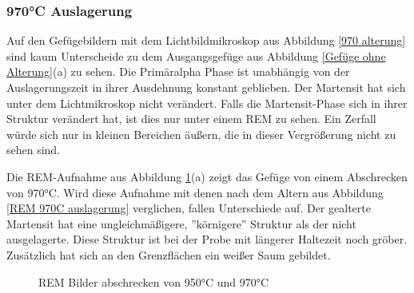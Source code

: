 \documentclass[a4paper, 11pt]{tubsreprt}
\begin{document}
\subsubsection{970°C Auslagerung}
Auf den Gefügebildern mit dem Lichtbildmikroskop aus Abbildung \ref{970 alterung} sind kaum Unterscheide zu dem Ausgangsgefüge aus Abbildung \ref{Gefüge ohne Alterung}(a) zu sehen. Die Primäralpha Phase ist unabhängig von der Auslagerungszeit in ihrer Ausdehnung konstant geblieben. Der Martensit hat sich unter dem Lichtmikroskop nicht verändert. Falls die Martensit-Phase sich in ihrer Struktur verändert hat, ist dies nur unter einem REM zu sehen. Ein Zerfall würde sich nur in kleinen Bereichen äußern, die in dieser Vergrößerung nicht zu sehen sind. 


Die REM-Aufnahme aus Abbildung \ref{REM 970C und 950C}(a) zeigt das Gefüge von einem Abschrecken von 970°C. Wird diese Aufnahme mit denen nach dem Altern aus Abbildung \ref{REM 970C auslagerung} verglichen, fallen Unterschiede auf. Der gealterte Martensit hat eine ungleichmäßigere, ''körnigere''  Struktur als der nicht ausgelagerte. Diese Struktur ist bei der Probe mit längerer Haltezeit noch gröber. Zusätzlich hat sich an den Grenzflächen ein weißer Saum gebildet.
\begin{figure}
\caption{REM Bilder abschrecken von 950°C und 970°C}
\label{REM 970C und 950C}
\end{figure}
\end{document}
